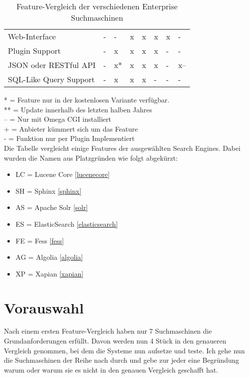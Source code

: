 \begin{table}
\begin{tabular}{l | l | l | l | l | l | l | l}
        Web-Interface                               & - & -  & x  & x  & x & x  & - \\
        Plugin Support                              & - & x  & x  & x  & x & -  & - \\
        JSON oder RESTful API                       & - & x* & x  & x  & x & -  & x-- \\
        SQL-Like Query Support                      & - & x  & x  & x  & - & -  & - \\
		\end{tabular}
    \caption{Feature-Vergleich der verschiedenen Enterprise Suchmaschinen }
    \label{vglTable}

    *  = Feature nur in der kostenlosen Variante verfügbar. \\
    ** = Update innerhalb des letzten halben Jahres \\
    -- = Nur mit Omega CGI installiert \\
    +  = Anbieter kümmert sich um das Feature \\
    -  = Funktion nur per Plugin Implementiert \\

    Die Tabelle vergleicht einige Features der ausgewählten Search Engines. Dabei wurden die Namen aus Platzgründen wie folgt abgekürzt:

    \begin{itemize}
        \item LC = Lucene Core \ref{lucenecore}
        \item SH = Sphinx \ref{sphinx}
        \item AS = Apache Solr \ref{solr}
        \item ES = ElasticSearch \ref{elasticsearch}
        \item FE = Fess \ref{fess}
        \item AG = Algolia \ref{algolia}
        \item XP = Xapian \ref{xapian}
    \end{itemize} 


\end{table}

\section{Vorauswahl}

Nach einem ersten Feature-Vergleich haben nur 7 Suchmaschinen die Grundanforderungen erfüllt. Davon werden nun 4 Stück in den genaueren Vergleich genommen, bei dem die Systeme nun aufsetze und teste. Ich gehe nun die Suchmaschinen der Reihe nach durch und gebe zur jeder eine Begründung warum oder warum sie es nicht in den genauen Vergleich geschafft hat.

